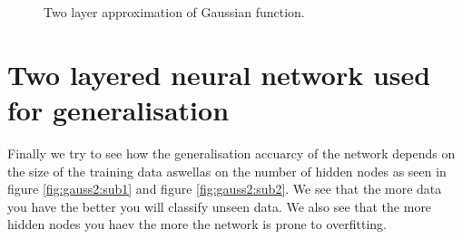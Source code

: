 \documentclass[a4paper,11pt]{article}
\begin{document}
\begin{figure}[h!]
\label{fig:gauss1}
\caption{Two layer approximation of Gaussian function.}
\end{figure}

\clearpage
\section{Two layered neural network used for generalisation}
Finally we try to see how the generalisation accuarcy of the network depends on the size of the training data aswellas on the number of hidden nodes as seen in figure \ref{fig:gauss2:sub1} and figure \ref{fig:gauss2:sub2}. We see that the more data you have the better you will classify unseen data. We also see that the more hidden nodes you haev the more the network is prone to overfitting.
\end{document}
